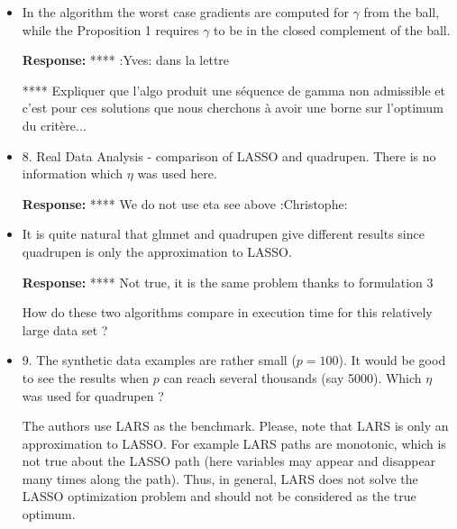 \documentclass[a4paper,11pt]{texMemo}
\newenvironment{comment}
{
   \par\medskip \color{black}%
   \textbf{Response: }}
{\medskip}
\newenvironment{remark}
{\begin{itshape} \color{gray}}
{\end{itshape}}
\begin{document}
\begin{itemize}
\begin{comment}
**** upper bound est le terme de droite :Yves:

\end{comment}
\item
  \begin{remark}
In the algorithm the worst case gradients are computed for $\gamma$ from the ball,
while the Proposition 1 requires $\gamma$  to be in the closed
complement of the ball.

\end{remark}
\begin{comment}
**** :Yves: dans la lettre

**** Expliquer que l'algo produit une séquence de gamma non admissible et c'est pour ces solutions 
que nous cherchons à avoir une borne sur l'optimum du critère...
\end{comment}
\item 
  \begin{remark}
    8. Real Data Analysis - comparison of LASSO and quadrupen.  There
    is no information which $\eta$ was used here.
  \end{remark}

  \begin{comment}
**** We do not use eta see above :Christophe:
\end{comment}
\item

  \begin{remark}
It is quite natural that glmnet and quadrupen give different results since quadrupen is only the
approximation to LASSO. 
\end{remark}
\begin{comment}
**** Not true, it is the same problem thanks to formulation 3
\end{comment}

\begin{remark}
  How do these two algorithms compare in execution time for this
  relatively large data set ?
\end{remark}

\item
  \begin{remark}
    9. The synthetic data examples are rather small ($p = 100$).  It
    would be good to see the results when $p$ can reach several
    thousands (say 5000).  Which $\eta$ was used for quadrupen ?
\end{remark}


\begin{remark}
  The authors use LARS as the benchmark.  Please, note that LARS is
  only an approximation to LASSO.  For example LARS paths are
  monotonic, which is not true about the LASSO path (here variables
  may appear and disappear many times along the path).  Thus, in
  general, LARS does not solve the LASSO optimization problem and
  should not be considered as the true optimum.
\end{remark}


\end{itemize}
\end{document}
